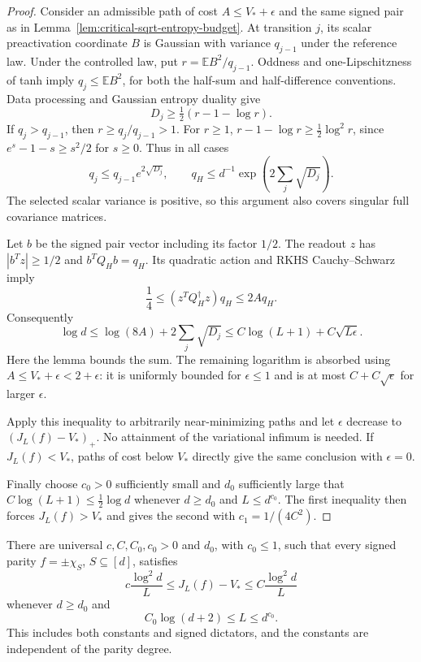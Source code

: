 \begin{proof}
Consider an admissible path of cost $A\le V_*+\epsilon$ and the
same signed pair as in Lemma~\ref{lem:critical-sqrt-entropy-budget}.
At transition $j$, its scalar preactivation coordinate $B$ is Gaussian
with variance $q_{j-1}$ under the reference law. Under the controlled
law, put $r=\mathbb EB^2/q_{j-1}$. Oddness and one-Lipschitzness of
tanh imply $q_j\le\mathbb EB^2$, for both the half-sum and
half-difference conventions. Data processing and Gaussian entropy
duality give
\[
 D_j\ge\tfrac12(r-1-\log r).
\]
If $q_j>q_{j-1}$, then $r\ge q_j/q_{j-1}>1$. For $r\ge1$,
$r-1-\log r\ge\tfrac12\log^2r$, since
$e^s-1-s\ge s^2/2$ for $s\ge0$. Thus in all cases
\[
 q_j\le q_{j-1}e^{2\sqrt{D_j}},\qquad
 q_H\le d^{-1}\exp\left(2\sum_j\sqrt{D_j}\right).
\]
The selected scalar variance is positive, so this argument also covers
singular full covariance matrices.

Let $b$ be the signed pair vector including its factor $1/2$. The
readout $z$ has $|b^Tz|\ge1/2$ and $b^TQ_Hb=q_H$. Its quadratic action
and RKHS Cauchy--Schwarz imply
\[
 \frac14\le (z^TQ_H^\dagger z)q_H\le2Aq_H.
\]
Consequently
\[
 \log d\le\log(8A)+2\sum_j\sqrt{D_j}
 \le C\log(L+1)+C\sqrt{L\epsilon}.
\]
Here the lemma bounds the sum. The remaining logarithm is absorbed
using $A\le V_*+\epsilon<2+\epsilon$:
it is uniformly bounded for $\epsilon\le1$ and is at most
$C+C\sqrt\epsilon$ for larger $\epsilon$.

Apply this inequality to arbitrarily near-minimizing paths and let
$\epsilon$ decrease to $(J_L(f)-V_*)_+$. No attainment of the
variational infimum is needed. If $J_L(f)<V_*$, paths of cost below
$V_*$ directly give the same conclusion with $\epsilon=0$.

Finally choose $c_0>0$ sufficiently small and $d_0$ sufficiently large
that $C\log(L+1)\le\tfrac12\log d$ whenever
$d\ge d_0$ and $L\le d^{c_0}$. The first inequality then forces
$J_L(f)>V_*$ and gives the second with $c_1=1/(4C^2)$.
\end{proof}

\begin{corollary}
\label{cor:critical-parity-excess-order}
There are universal $c,C,C_0,c_0>0$ and $d_0$, with $c_0\le1$, such
that every signed parity $f=\pm\chi_S$, $S\subseteq[d]$, satisfies
\[
 c\frac{\log^2d}{L}\le J_L(f)-V_*
       \le C\frac{\log^2d}{L}
\]
whenever $d\ge d_0$ and
\[
 C_0\log(d+2)\le L\le d^{c_0}.
\]
This includes both constants and signed dictators, and the constants
are independent of the parity degree.
\end{corollary}

